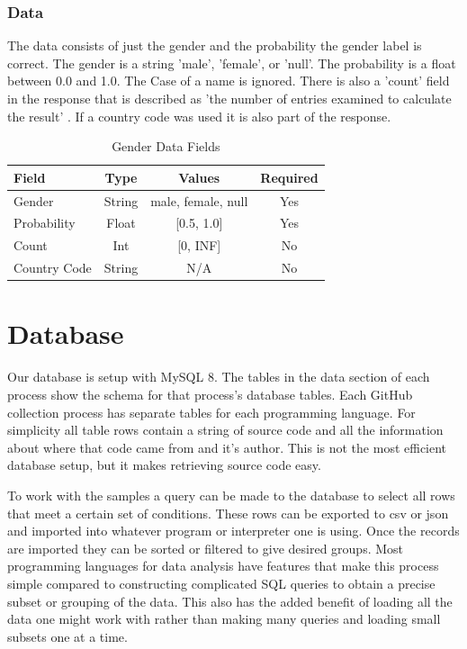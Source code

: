 \documentclass[12pt]{article}
\begin{document}
\subsubsection*{Data}
The data consists of just the gender and the probability the gender label is correct. The gender is a string 'male', 'female', or 'null'. The probability is a float between 0.0 and 1.0. The Case of a name is ignored. There is also a 'count' field in the response that is described as 'the number of entries examined to calculate the result' \cite{WEBSITE:GENDER1}. If a country code was used it is also part of the response.

\begin{table}[t]
    \begin{center}
        \caption{Gender Data Fields}
        \label{tab:gen_data}
        \begin{tabular}{| l |c | c | c |}
            \hline
            \textbf{Field} & \textbf{Type} & \textbf{Values} & \textbf{Required}\\
            \hline
            Gender & String & {male, female, null} & Yes\\
            Probability & Float & [0.5, 1.0] & Yes\\ 
            Count & Int & [0, INF] & No\\
            Country Code & String & N/A & No\\
            \hline
        \end{tabular}
    \end{center}
\end{table}


\section{Database}

Our database is setup with MySQL 8. The tables in the data section of each process show the schema for that process's database tables. Each GitHub collection process has separate tables for each programming language. For simplicity all table rows contain a string of source code and all the information about where that code came from and it's author. This is not the most efficient database setup, but it makes retrieving source code easy.

To work with the samples a query can be made to the database to select all rows that meet a certain set of conditions. These rows can be exported to csv or json and imported into whatever program or interpreter one is using. Once the records are imported they can be sorted or filtered to give desired groups. Most programming languages for data analysis have features that make this process simple compared to constructing complicated SQL queries to obtain a precise subset or grouping of the data. This also has the added benefit of loading all the data one might work with rather than making many queries and loading small subsets one at a time.
\end{document}
